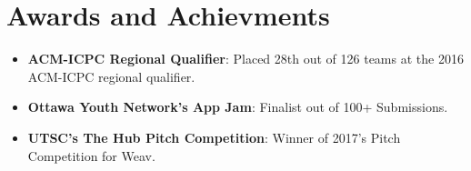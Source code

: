 \documentclass[letterpaper,11pt]{article}
\newcommand{\resumeItem}[2]{
  \item\small{
    \textbf{#1}{: #2 \vspace{-2pt}}
  }
}
\newcommand{\resumeSubItem}[2]{\resumeItem{#1}{#2}\vspace{-4pt}}
\newcommand{\resumeSubHeadingListStart}{\begin{itemize}[leftmargin=*]}
\newcommand{\resumeSubHeadingListEnd}{\end{itemize}}
\begin{document}
%
\section{Awards and Achievments}
\resumeSubHeadingListStart
    \resumeSubItem{ACM-ICPC Regional Qualifier}
      {Placed 28th out of 126 teams at the 2016 ACM-ICPC regional qualifier.}
    \resumeSubItem{Ottawa Youth Network's App Jam}
      {Finalist out of 100+ Submissions.}
    \resumeSubItem{UTSC's The Hub Pitch Competition}
      {Winner of 2017's Pitch Competition for Weav.}
 \resumeSubHeadingListEnd

\end{document}

